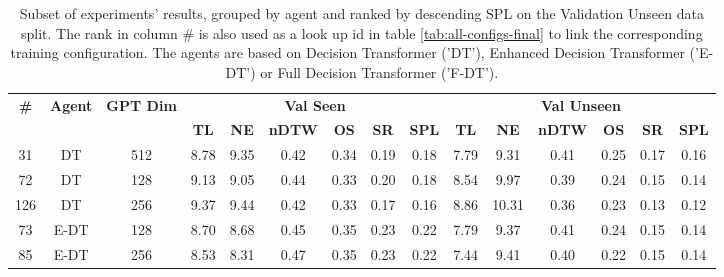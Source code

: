 \begin{table}
\centering
\caption{\label{tab:dim_test}Subset of experiments' results, grouped by agent and ranked by descending SPL on the Validation Unseen data split. The rank in column \# is also used as a look up id in table \ref{tab:all-configs-final} to link the corresponding training configuration.     \newline The agents are based on Decision Transformer ('DT'), Enhanced Decision Transformer ('E-DT') or Full Decision Transformer ('F-DT').}
\begin{tabular}{@{\hskip3pt}c@{\hskip3pt}c@{\hskip3pt}c@{\hskip3pt}c@{\hskip3pt}c@{\hskip3pt}c@{\hskip3pt}c@{\hskip3pt}c@{\hskip3pt}c@{\hskip3pt}c@{\hskip3pt}c@{\hskip3pt}c@{\hskip3pt}c@{\hskip3pt}c@{\hskip3pt}c}
\toprule
\textbf{\#} & \textbf{Agent} & \textbf{GPT Dim} & \multicolumn{6}{c}{\textbf{Val Seen}} & \multicolumn{6}{c}{\textbf{Val Unseen}} \\
 \cmidrule(l){4-9} \cmidrule(l){10-15} \textbf{~} &     \textbf{~} &       \textbf{~} &       \textbf{TL} & \textbf{NE} & \textbf{nDTW} & \textbf{OS} & \textbf{SR} & \textbf{SPL} &         \textbf{TL} & \textbf{NE} & \textbf{nDTW} & \textbf{OS} & \textbf{SR} & \textbf{SPL} \\
\midrule
         31 &             DT &              512 &              8.78 &        9.35 &          0.42 &        0.34 &        0.19 &         0.18 &                7.79 &        9.31 &          0.41 &        0.25 &        0.17 &         0.16 \\
         72 &             DT &              128 &              9.13 &        9.05 &          0.44 &        0.33 &        0.20 &         0.18 &                8.54 &        9.97 &          0.39 &        0.24 &        0.15 &         0.14 \\
        126 &             DT &              256 &              9.37 &        9.44 &          0.42 &        0.33 &        0.17 &         0.16 &                8.86 &       10.31 &          0.36 &        0.23 &        0.13 &         0.12 \\
         73 &           E-DT &              128 &              8.70 &        8.68 &          0.45 &        0.35 &        0.23 &         0.22 &                7.79 &        9.37 &          0.41 &        0.24 &        0.15 &         0.14 \\
         85 &           E-DT &              256 &              8.53 &        8.31 &          0.47 &        0.35 &        0.23 &         0.22 &                7.44 &        9.41 &          0.40 &        0.22 &        0.15 &         0.14 \\

\end{tabular}
\end{table}
